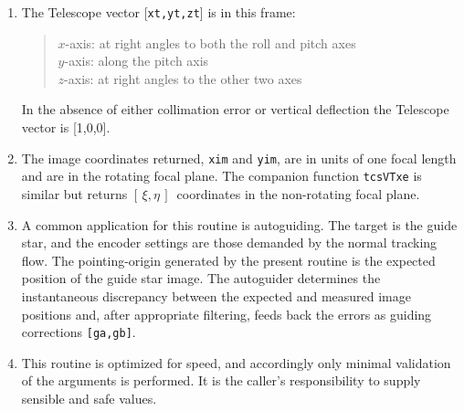 \documentclass[12pt,fleqn,twoside]{article}
\renewcommand{\_}{{\tt\char'137}}     %
\newcommand{\radec}     {$[\,\alpha,\delta\,]$}
\newcommand{\hadec}     {$[\,h,\delta\,]$}
\newcommand{\xieta}     {$[\,\xi,\eta\,]$}
\newcommand{\azel}      {$[\,Az,El~]$}
\begin{document}
{\begin{enumerate}
\begin{tabbing}
         \> {\tt sst,cst} \> \radec\ $\Rightarrow$ \hadec \\
         \> {\tt spm2   } \> geocentric \hadec\ $\Rightarrow$ {\sc Aim}
      \end{tabbing}
      \begin{tabbing}
         xxx \= xxxxxxxxxx \= \kill
         \> {\tt frame  } \> {\tt APPT\_TOPO} \\
         \> {\tt target } \> topocentric apparent \radec \\
         \> {\tt spm1   } \> identity matrix \\
         \> {\tt sst,cst} \> \radec\ $\Rightarrow$ \hadec \\
         \> {\tt spm2   } \> topocentric \hadec\ $\Rightarrow$ {\sc Aim}
      \end{tabbing}
      \begin{tabbing}
         xxx \= xxxxxxxxxx \= \kill
         \> {\tt frame  } \> {\tt AZEL\_TOPO} \\
         \> {\tt target } \> topocentric \azel\ (N thru E) \\
         \> {\tt spm1   } \> identity matrix \\
         \> {\tt sst,cst} \> not used \\
         \> {\tt spm2   } \> topocentric \azel\ $\Rightarrow$ {\sc Aim}
      \end{tabbing}

      ICRS $\approx$ FK5 J2000 to better than 25 mas.
\item The {\sc Telescope} vector [{\tt xt,yt,zt}] is in this frame:
      \begin{quote}
      $x$-axis:  at right angles to both the roll and pitch axes \\
      $y$-axis:  along the pitch axis \\
      $z$-axis:  at right angles to the other two axes
      \end{quote}
      In the absence of either collimation error or vertical deflection
      the {\sc Telescope} vector is [1,0,0].
\item The image coordinates returned,
       {\tt xim} and {\tt yim}, are in units of one
       focal length and are in the rotating focal plane.  The companion
       function {\tt tcsVTxe} is similar but returns
       \xieta\ coordinates in the
       non-rotating focal plane.
\item A common application for this routine is autoguiding.  The target
      is the guide star, and the encoder settings are those demanded by
      the normal tracking flow.  The pointing-origin generated by the
      present routine is the expected position of the guide star image.
      The autoguider determines the instantaneous discrepancy between
      the expected and measured image positions and, after appropriate
      filtering, feeds back the errors as guiding corrections
      {\tt [ga,gb]}.
\item This routine is optimized for speed, and accordingly only minimal
      validation of the arguments is performed.  It is the caller's
      responsibility to supply sensible and safe values.
\end{enumerate}
}
\end{document}
